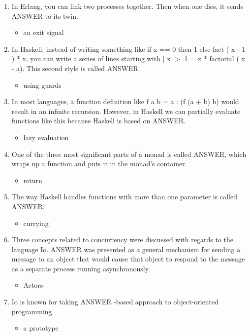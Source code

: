 \documentclass{exam}
\begin{document}
\begin{enumerate}
\begin{itemize}
\end{itemize}
\item In Erlang, you can link two processes together.  Then when one dies, it sends ANSWER to its twin.
\begin{itemize}
\item an exit signal
\end{itemize}
\item In Haskell, instead of writing something like if x == 0 then 1 else fact ( x - 1 ) * x, you can write a series of lines starting with $|$ x $>$ 1 = x * factorial ( x - a).  This second style is called ANSWER.
\begin{itemize}
\item using guards
\end{itemize}
\item In most languages, a function definition like f a b = a : (f (a + b) b) would result in an infinite recursion.  However, in Haskell we can partially evaluate functions like this because Haskell is based on ANSWER.
\begin{itemize}
\item lazy evaluation
\end{itemize}
\item One of the three most significant parts of a monad is called ANSWER, which wraps up a function and puts it in the monad's container.
\begin{itemize}
\item return
\end{itemize}
\item The way Haskell handles functions with more than one parameter is called ANSWER.
\begin{itemize}
\item currying
\end{itemize}
\item Three concepts related to concurrency were discussed with regards to the language Io.  ANSWER was presented as a general mechanism for sending a message to an object that would cause that object to respond to the message as a separate process running asynchronously.
\begin{itemize}
\item Actors
\end{itemize}
\item Io is known for taking ANSWER -based approach to object-oriented programming.
\begin{itemize}
\item a prototype
\end{itemize}

\end{enumerate}
\end{document}
